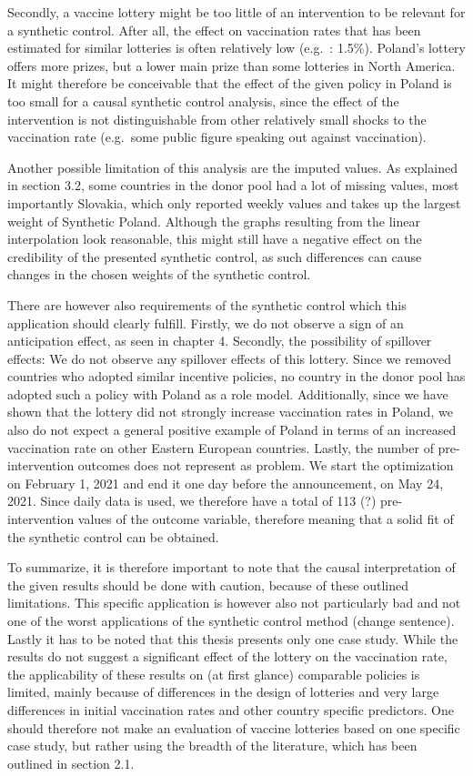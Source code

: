 \documentclass{scrbook}
\begin{document}
Secondly, a vaccine lottery might be too little of an intervention to be
relevant for a synthetic control. After all, the effect on vaccination
rates that has been estimated for similar lotteries is often relatively
low (e.g.~\textcite{barber_conditional_2022}: 1.5\%). Poland's lottery
offers more prizes, but a lower main prize than some lotteries in North
America. It might therefore be conceivable that the effect of the given
policy in Poland is too small for a causal synthetic control analysis,
since the effect of the intervention is not distinguishable from other
relatively small shocks to the vaccination rate (e.g.~some public figure
speaking out against vaccination).

Another possible limitation of this analysis are the imputed values. As
explained in section 3.2, some countries in the donor pool had a lot of
missing values, most importantly Slovakia, which only reported weekly
values and takes up the largest weight of Synthetic Poland. Although the
graphs resulting from the linear interpolation look reasonable, this
might still have a negative effect on the credibility of the presented
synthetic control, as such differences can cause changes in the chosen
weights of the synthetic control.

There are however also requirements of the synthetic control which this
application should clearly fulfill. Firstly, we do not observe a sign of
an anticipation effect, as seen in chapter 4. Secondly, the possibility
of spillover effects: We do not observe any spillover effects of this
lottery. Since we removed countries who adopted similar incentive
policies, no country in the donor pool has adopted such a policy with
Poland as a role model. Additionally, since we have shown that the
lottery did not strongly increase vaccination rates in Poland, we also
do not expect a general positive example of Poland in terms of an
increased vaccination rate on other Eastern European countries. Lastly,
the number of pre-intervention outcomes does not represent as problem.
We start the optimization on February 1, 2021 and end it one day before
the announcement, on May 24, 2021. Since daily data is used, we
therefore have a total of 113 (?) pre-intervention values of the outcome
variable, therefore meaning that a solid fit of the synthetic control
can be obtained.

To summarize, it is therefore important to note that the causal
interpretation of the given results should be done with caution, because
of these outlined limitations. This specific application is however also
not particularly bad and not one of the worst applications of the
synthetic control method (change sentence). Lastly it has to be noted
that this thesis presents only one case study. While the results do not
suggest a significant effect of the lottery on the vaccination rate, the
applicability of these results on (at first glance) comparable policies
is limited, mainly because of differences in the design of lotteries and
very large differences in initial vaccination rates and other country
specific predictors. One should therefore not make an evaluation of
vaccine lotteries based on one specific case study, but rather using the
breadth of the literature, which has been outlined in section 2.1.
\end{document}
